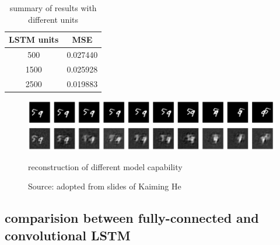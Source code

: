 \documentclass[twoside,a4paper,article]{combine}
\begin{document}
\begin{table}[h!]
\centering
\begin{tabular}{ c c } 
    \hline
    LSTM units & MSE \\
    \hline
    500 & 0.027440 \\
    1500 & 0.025928 \\
    2500 & 0.019883 \\
    \hline
    \end{tabular}
    \caption{summary of results with different units}
\label{table:units}
\end{table}

\begin{figure}[ht!]
    \includegraphics[width=\linewidth]{fc-builtin-2500-200}
    \caption{reconstruction of different model capability}
    \caption*{Source: adopted from slides of Kaiming He}
    \label{fig:units}
\end{figure}

\subsection{comparision between fully-connected and convolutional LSTM}




\end{document}
